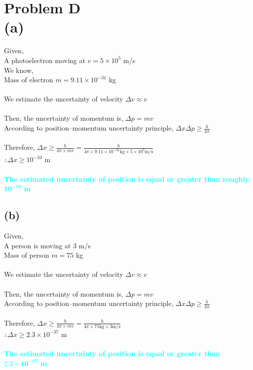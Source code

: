 \documentclass[14pt]{article}
\begin{document}
\newpage

\section*{\centering \textcolor{goldColor}{\textbf{Problem D\\ (a)}}}

Given,\\
\hspace*{0.5cm} A photoelectron moving at $v=5\times10^5$ m/s\\
We know,\\
\hspace*{0.5cm} Mass of electron $m=9.11\times10^{-31}$ kg\\\\
We estimate the uncertainty of velocity $\Delta v\approx v$  \\\\
Then, the uncertainty of momentum is, $\Delta p=mv$\\
According to  position–momentum uncertainty principle, $\Delta x \Delta p \geq \frac{h}{4\pi}$ \\\\
Therefore, $\Delta x \geq \frac{h}{4\pi\times mv}=\frac{h}{4\pi\times 9.11\times10^{-31}\mathrm{kg}\times5\times10^5\mathrm{m/s}}$\\
$\therefore \Delta x \geq 10^{-10}$ m\\\\
\textcolor{cyan}{\textbf{The estimated uncertainty of position is equal or greater than roughly }$\mathbf{10^{-10}}$\textbf{ m}}

\begin{center}
    \section*{\textcolor{goldColor}{\textbf{(b)}}}
\end{center}
Given,\\
\hspace*{0.5cm} A person is moving at $3$ m/s\\
\hspace*{0.5cm} Mass of person $m=75$ kg\\\\
We estimate the uncertainty of velocity $\Delta v\approx v$\\\\
Then, the uncertainty of momentum is, $\Delta p=mv$\\
According to  position–momentum uncertainty principle, $\Delta x \Delta p \geq \frac{h}{4\pi}$ \\\\
Therefore, $\Delta x \geq \frac{h}{4\pi\times mv}=\frac{h}{4\pi\times 75\mathrm{ kg}\times3\mathrm{  m/s}}$\\
$\therefore \Delta x \geq 2.3\times10^{-37}$ m\\\\
\textcolor{cyan}{\textbf{The estimated uncertainty of position is equal or greater than }$\mathbf{2.3\times10^{-37}}$\textbf{ m}}\\\\
\end{document}
